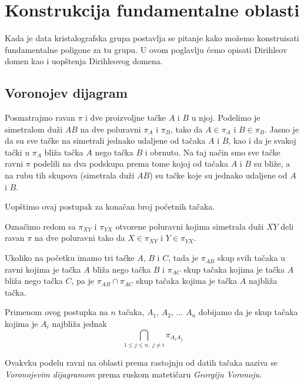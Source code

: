 \documentclass[11pt]{article}
\begin{document}

    \section{Konstrukcija fundamentalne oblasti}\label{dirihleova-fundamentalna-oblast} Kada je data kristalografska grupa postavlja se pitanje kako mo\v zemo konstruisati fundamentalne poligone za tu grupu. U ovom poglavlju \' cemo opisati Dirihleov domen kao i uop\v stenja Dirihleovog domena.
\subsection{Voronojev dijagram}


Posmatrajmo ravan $\pi$ i dve proizvoljne ta\v cke $A$ i $B$ u njoj. Podelimo je simetralom du\v zi $AB$ na dve poluravni $\pi _A$ i $\pi _B$, tako da $A \in \pi _ A$ i $B \in \pi _B$. Jasno je da su sve ta\v cke na simetrali jednako udaljene od ta\v caka $A$ i $B$, kao i da je svakoj ta\v cki u $\pi _A$ bli\v za ta\v cka $A$ nego ta\v cka $B$ i obrnuto. 
Na taj na\v cin smo sve ta\v cke ravni $\pi$ podelili na dva podskupa prema tome kojoj od ta\v caka $A$ i $B$ su bli\v ze, a na rubu tih skupova (simetrala du\v zi $AB$) su ta\v cke koje su jednako udaljene od $A$ i $B$.

Uop\v stimo ovaj postupak za kona\v can broj po\v cetnih ta\v caka.

Ozna\v cimo redom sa $\pi _{XY}$ i $\pi _{YX}$ otvorene poluravni kojima simetrala du\v zi $XY$ deli ravan $\pi$ na dve poluravni tako da $X \in \pi _ {XY}$ i $Y \in \pi _{YX}$. 

Ukoliko na po\v cetku imamo tri ta\v cke $A$, $B$ i $C$, tada je $\pi _{AB}$ skup svih ta\v caka u ravni kojima je ta\v cka $A$ bli\v za nego ta\v cka $B$ i $\pi _{AC}$ skup ta\v caka kojima je ta\v cka $A$ bli\v za nego ta\v cka $C$, pa je $\pi _{AB} \cap \pi _{AC}$ skup ta\v caka kojima je ta\v cka $A$ najbli\v za ta\v cka.

Primenom ovog postupka na  $n$ ta\v caka, $A_1$, $A_2$, ... $A_n$ dobijamo da je skup ta\v caka kojima je $A_i$ najbli\v za  jednak $$\bigcap _{1\leq j\leq n,\; j\neq i} \pi_{A_i A_j}$$

Ovakvku podelu ravni na oblasti prema rastojnju od datih ta\v caka naziva se \emph{Voronojevim dijagramom} prema ruskom mateti\v caru \emph{Georgiju Voronoju}.
\end{document}
